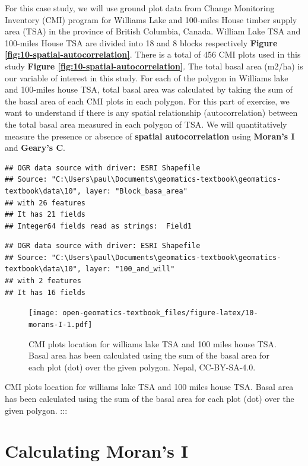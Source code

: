 \documentclass[
]{book}
\begin{document}
For this case study, we will use ground plot data from Change Monitoring Inventory (CMI) program \citep[for details:][]{province_of_bc_provincial_2018} for Williams Lake and 100-miles House timber supply area (TSA) in the province of British Columbia, Canada. William Lake TSA and 100-miles House TSA are divided into 18 and 8 blocks respectively \textbf{Figure \ref{fig:10-spatial-autocorrelation}}. There is a total of 456 CMI plots used in this study \textbf{Figure \ref{fig:10-spatial-autocorrelation}}. The total basal area (m2/ha) is our variable of interest in this study. For each of the polygon in Williams lake and 100-miles house TSA, total basal area was calculated by taking the sum of the basal area of each CMI plots in each polygon. For this part of exercise, we want to understand if there is any spatial relationship (autocorrelation) between the total basal area measured in each polygon of TSA. We will quantitatively measure the presence or absence of \textbf{spatial autocorrelation} using \textbf{Moran's I} and \textbf{Geary's C}.

\begin{verbatim}
## OGR data source with driver: ESRI Shapefile 
## Source: "C:\Users\paul\Documents\geomatics-textbook\geomatics-textbook\data\10", layer: "Block_basa_area"
## with 26 features
## It has 21 fields
## Integer64 fields read as strings:  Field1
\end{verbatim}

\begin{verbatim}
## OGR data source with driver: ESRI Shapefile 
## Source: "C:\Users\paul\Documents\geomatics-textbook\geomatics-textbook\data\10", layer: "100_and_will"
## with 2 features
## It has 16 fields
\end{verbatim}

\begin{figure}
\centering
\texttt{[image: open-geomatics-textbook\_files/figure-latex/10-morans-I-1.pdf]}
\caption{\label{fig:10-morans-I}CMI plots location for williams lake TSA and 100 miles house TSA. Basal area has been calculated using the sum of the basal area for each plot (dot) over the given polygon. Nepal, CC-BY-SA-4.0.}
\end{figure}

CMI plots location for williams lake TSA and 100 miles house TSA. Basal area has been calculated using the sum of the basal area for each plot (dot) over the given polygon.
:::

\hypertarget{calculating-morans-i}{%
\section*{Calculating Moran's I}\label{calculating-morans-i}}
\end{document}

